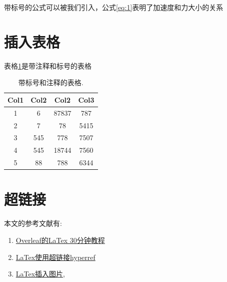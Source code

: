 \documentclass{article}
\begin{document}
  带标号的公式可以被我们引入，公式\ref{eq:1}表明了加速度和力大小的关系

\section{插入表格}
  表格\ref{table:data}是带注释和标号的表格
  \begin{table}[H]
  \centering
    \begin{tabular}{||c c c c||}  %
     \hline %
     Col1 & Col2 & Col2 & Col3 \\ [0.5ex] 
     \hline\hline
     1 & 6 & 87837 & 787 \\ 
     2 & 7 & 78 & 5415 \\
     3 & 545 & 778 & 7507 \\
     4 & 545 & 18744 & 7560 \\
     5 & 88 & 788 & 6344 \\ [1ex] 
     \hline
    \end{tabular} %
  \caption{带标号和注释的表格.}
  \label{table:data}
  \end{table}
  

\section{超链接}
本文的参考文献有: 

\begin{enumerate}
  \item \href{https://www.overleaf.com/learn/latex/Learn_LaTeX_in_30_minutes}{Overleaf的LaTex 30分钟教程}
  \item \href{https://www.overleaf.com/learn/latex/Hyperlinks#Introduction}{LaTex使用超链接hyperref}
  \item \href{https://www.overleaf.com/learn/latex/Positioning_images_and_tables}{LaTex插入图片}, 
\end{enumerate}


\newpage
\end{document}
